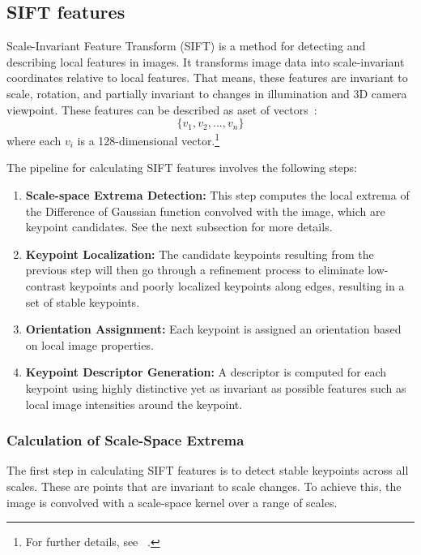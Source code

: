


\subsection*{SIFT features}
Scale-Invariant Feature Transform (SIFT) is a method for detecting and describing local features in images. It transforms image data into scale-invariant
coordinates relative to local features. That means, these features are invariant to scale, rotation, and partially invariant to changes in illumination
and 3D camera viewpoint. These features can be described as aset of vectors~\cite{Lowe.2004}:
\begin{equation}
\{v_1, v_2, ..., v_n\}
\end{equation}
where each $v_i$ is a 128-dimensional vector.\footnote{For further details, see ~\cite{Lowe.2004}.}

The pipeline for calculating SIFT features involves the following steps: %
\begin{enumerate} %
    \item \textbf{Scale-space Extrema Detection:} This step computes the local extrema of the Difference of Gaussian function convolved with the image, which are
    keypoint candidates. See the next subsection for more details.
    \item \textbf{Keypoint Localization:} The candidate keypoints resulting from the previous step will then go through a refinement process to eliminate
    low-contrast keypoints and poorly localized keypoints along edges, resulting in a set of stable keypoints.
    \item \textbf{Orientation Assignment:} Each keypoint is assigned an orientation based on local image properties.
    \item \textbf{Keypoint Descriptor Generation:} A descriptor is computed for each keypoint using highly distinctive yet as invariant as possible features such
    as local image intensities around the keypoint.
\end{enumerate}

\subsubsection*{Calculation of Scale-Space Extrema}
The first step in calculating SIFT features is to detect stable keypoints across all scales. These are points that are invariant to scale changes. To achieve this, the
image is convolved with a scale-space kernel over a range of scales.

